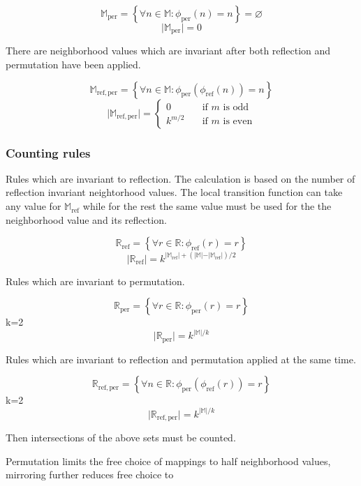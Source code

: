 \documentclass{ijuc}
\begin{document}
\[ \mathbb{M}_\mathrm{per} = \left\{ \forall n \in \mathbb{M} : \phi_\mathrm{per}(n) = n \right\} = \varnothing \]
\[ \vert \mathbb{M}_\mathrm{per} \vert = 0 \]

There are neighborhood values which are invariant after both reflection and permutation have been applied.

\[ \mathbb{M}_\mathrm{ref,per} = \left\{ \forall n \in \mathbb{M} : \phi_\mathrm{per}(\phi_\mathrm{ref}(n)) = n \right\} \]
\[ \vert \mathbb{M}_\mathrm{ref,per} \vert = \left\{ 
  \begin{array}{ll}
    {0        } & \quad \textrm{if $m$ is odd }\\
    {k^{m/2  }} & \quad \textrm{if $m$ is even}
  \end{array} \right.
\]

\subsubsection{Counting rules}

Rules which are invariant to reflection. The calculation is based on the number of reflection invariant neightorhood values.
The local transition function can take any value for \(\mathbb{M}_\mathrm{ref}\) while for the rest the same value must be used
for the the neighborhood value and its reflection.

\[ \mathbb{R}_\mathrm{ref} = \left\{ \forall r \in \mathbb{R} : \phi_\mathrm{ref}(r) = r \right\} \]
\[ \vert \mathbb{R}_\mathrm{ref} \vert = k^{ \vert \mathbb{M}_\mathrm{ref} \vert + ( \vert \mathbb{M} \vert - \vert \mathbb{M}_\mathrm{ref} \vert ) / 2 } \]

Rules which are invariant to permutation.

\[ \mathbb{R}_\mathrm{per} = \left\{ \forall r \in \mathbb{R} : \phi_\mathrm{per}(r) = r \right\} \]
k=2
\[ \vert \mathbb{R}_\mathrm{per} \vert = k^{\vert \mathbb{M} \vert / k} \]

Rules which are invariant to reflection and permutation applied at the same time.

\[ \mathbb{R}_\mathrm{ref,per} = \left\{ \forall n \in \mathbb{R} : \phi_\mathrm{per}(\phi_\mathrm{ref}(r)) = r \right\} \]
k=2
\[ \vert \mathbb{R}_\mathrm{ref,per} \vert = k^{\vert \mathbb{M} \vert / k} \]

Then intersections of the above sets must be counted.

Permutation limits the free choice of mappings to half neighborhood values, mirroring further reduces free choice to 
\end{document}
